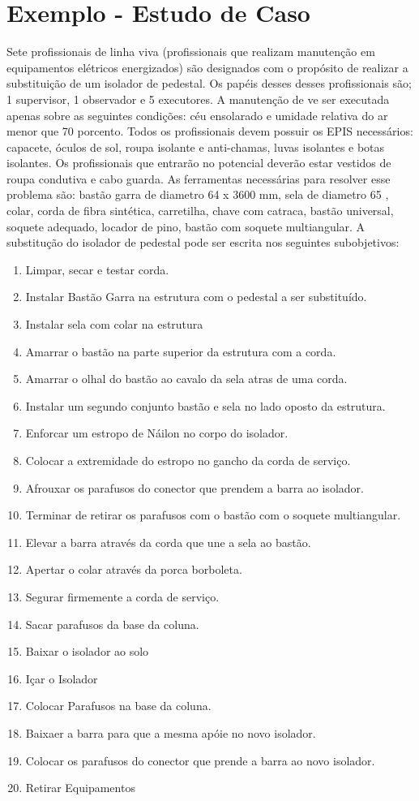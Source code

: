 \documentclass[12pt]{article}
\begin{document}
\section{Exemplo - Estudo de Caso}

Sete profissionais de linha viva (profissionais que realizam manutenção em equipamentos elétricos energizados) são designados com o propósito de realizar a substituição de um isolador de pedestal. Os papéis desses desses profissionais são; 1 supervisor, 1 observador e 5 executores. A manutenção de ve ser executada apenas sobre as seguintes condições: céu ensolarado e umidade relativa do ar menor que 70 porcento. Todos os profissionais devem possuir os EPIS necessários: capacete, óculos de sol, roupa isolante e anti-chamas, luvas isolantes e botas isolantes. Os profissionais que entrarão no potencial deverão estar vestidos de roupa condutiva e cabo guarda. As ferramentas necessárias para resolver esse problema são: bastão garra de diametro 64 x 3600 mm, sela de diametro 65 , colar, corda de fibra sintética, carretilha, chave com catraca, bastão universal, soquete adequado, locador de pino, bastão com soquete multiangular. A substitução do isolador de pedestal pode ser escrita nos seguintes subobjetivos: 


\begin{enumerate}
	\item Limpar, secar e testar corda.
	\item Instalar Bastão Garra na estrutura com o pedestal a ser substituído.
	\item Instalar sela com colar na estrutura
	\item Amarrar o bastão na parte superior da estrutura com a corda.
	\item Amarrar o olhal do bastão ao cavalo da sela atras de uma corda.
	\item Instalar um segundo conjunto bastão e sela no lado oposto da estrutura.
	\item Enforcar um estropo de Náilon no corpo do isolador.
	\item Colocar a extremidade do estropo no gancho da corda de serviço.
	\item Afrouxar os parafusos do conector que prendem a barra ao isolador.
	\item Terminar de retirar os parafusos com o bastão com o soquete multiangular.
	\item Elevar a barra através da corda que une a sela ao bastão.
	\item Apertar o colar através da porca borboleta.
	\item Segurar firmemente a corda de serviço.
	\item Sacar parafusos da base da coluna.
	\item Baixar o isolador ao solo
	\item Içar o Isolador
	\item Colocar Parafusos na base da coluna.
	\item Baixaer a barra para que a mesma apóie no novo isolador.
	\item Colocar os parafusos do conector que prende a barra ao novo isolador. 
	\item Retirar Equipamentos
\end{enumerate}
\end{document}
